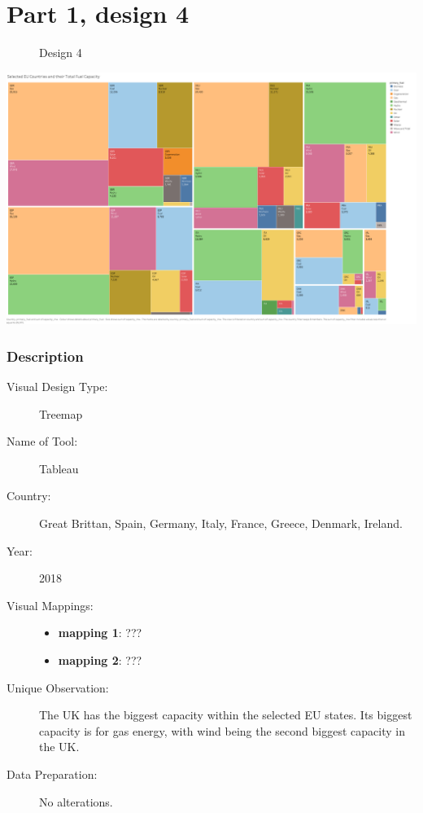 \hypertarget{part-1-design-4}{%
\section{Part 1, design 4}\label{part-1-design-4}}

\begin{figure}
\centering
\caption{Design 4}
\end{figure}

\centering
\includegraphics[width=15cm]{Viz4.png}

\hypertarget{description}{%
\subsubsection{Description}\label{description}}

\begin{description}
\item[Visual Design Type:]
Treemap
\item[Name of Tool:]
Tableau
\item[Country:]
Great Brittan, Spain, Germany, Italy, France, Greece, Denmark, Ireland.
\item[Year:]
2018
\item[Visual Mappings:]
\begin{itemize}
\tightlist
\item
  \textbf{mapping 1}: ???
\end{itemize}

\begin{itemize}
\tightlist
\item
  \textbf{mapping 2}: ???
\end{itemize}
\item[Unique Observation:]
The UK has the biggest capacity within the selected EU states. Its biggest capacity is for gas energy, with wind being the second biggest capacity in the UK.
\item[Data Preparation:]
No alterations.
\end{description}
 
